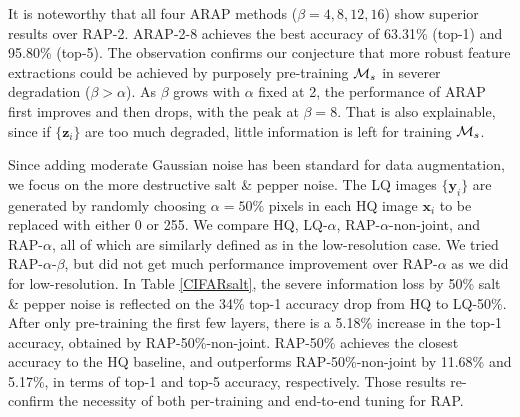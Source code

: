 \documentclass[10pt,twocolumn,twoside]{IEEEtran} %
\begin{document}
It is noteworthy that all four ARAP methods ($\beta = 4, 8, 12, 16$) show superior results over RAP-2. ARAP-2-8 achieves the best accuracy of 63.31\% (top-1) and 95.80\% (top-5). The observation confirms our conjecture that more robust feature extractions could be achieved by purposely pre-training ${\mathcal{M}}_s$ in severer degradation ($\beta > \alpha$). As $\beta$ grows with $\alpha$ fixed at 2, the performance of ARAP first improves and then drops, with the peak at $\beta = 8$. That is also explainable, since if $\{\mathbf{z}_i\}$ are too much degraded, little information is left for training ${\mathcal{M}}_s$. 

Since adding moderate Gaussian noise has been standard for data augmentation, we focus on the more destructive salt \& pepper noise. The LQ images $\{\mathbf{y}_i\}$ are generated by randomly choosing $\alpha = 50\%$ pixels in each HQ image $\mathbf{x}_i$ to be replaced with either 0 or 255. We compare HQ, LQ-$\alpha$, RAP-$\alpha$-non-joint, and RAP-$\alpha$, all of which are similarly defined as in the low-resolution case. We tried RAP-$\alpha$-$\beta$, but did not get much performance improvement over RAP-$\alpha$ as we did for low-resolution. In Table \ref{CIFARsalt}, the severe information loss by 50\% salt \& pepper noise is reflected on the 34\% top-1 accuracy drop from HQ to LQ-50\%. After only pre-training the first few layers, there is a 5.18\% increase in the top-1 accuracy, obtained by RAP-50\%-non-joint. RAP-50\% achieves the closest accuracy to the HQ baseline, and outperforms RAP-50\%-non-joint by 11.68\% and 5.17\%, in terms of top-1 and top-5 accuracy, respectively. Those results re-confirm the necessity of both per-training and end-to-end tuning for RAP.
\end{document}

